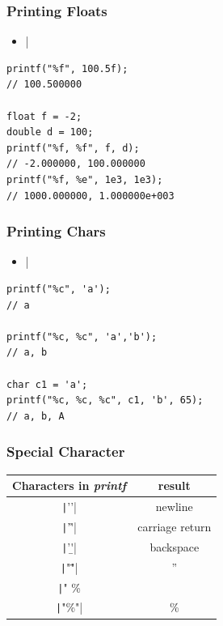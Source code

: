 \documentclass{../c-lecture}
\begin{document}
\begin{frame}[fragile]
  \frametitle{Printing Floats}
  \begin{itemize}
    \item {}|%
  \end{itemize}
  \begin{verbatim}
printf("%f", 100.5f);
// 100.500000

float f = -2;
double d = 100;
printf("%f, %f", f, d);
// -2.000000, 100.000000
printf("%f, %e", 1e3, 1e3);
// 1000.000000, 1.000000e+003
  \end{verbatim}
\end{frame}

\begin{frame}[fragile]
  \frametitle{Printing Chars}
  \begin{itemize}
    \item {}|%
  \end{itemize}
  \begin{verbatim}
printf("%c", 'a');
// a

printf("%c, %c", 'a','b');
// a, b

char c1 = 'a';
printf("%c, %c, %c", c1, 'b', 65);
// a, b, A
  \end{verbatim}
\end{frame}

\begin{frame}[fragile]
  \frametitle{Special Character}
  \begin{table}
  \begin{tabular}{cc}
    \toprule

    Characters in \textit{\color{Orange} printf} &
    result \\

    \midrule

    \texttt|'\n'| &
    newline \\

    \midrule

    \texttt|'\r'| &
    carriage return \\

    \midrule

    \texttt|'\b'| &
    backspace \\

    \midrule

    \texttt|"\""| &
    '' \\

    \midrule

    \texttt|"%
    \% \\

    \midrule

    \texttt|"\%"| &
    \% \\

    \bottomrule
  \end{tabular}
  \end{table}
\end{frame}
\end{document}
